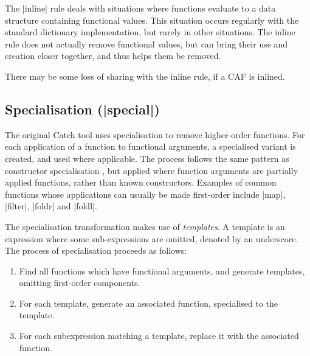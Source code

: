 \documentclass[preprint]{sigplanconf}
\begin{document}
The |inline| rule deals with situations where functions evaluate to a data structure containing functional values. This situation occurs regularly with the standard dictionary implementation, but rarely in other situations. The inline rule does not actually remove functional values, but can bring their use and creation closer together, and thus helps them be removed.

There may be some loss of sharing with the inline rule, if a CAF is inlined.

\subsection{Specialisation (|special|)}

The original Catch tool \cite{me:catch_tfp} uses specialisation to remove higher-order functions. For each application of a function to functional arguments, a specialised variant is created, and used where applicable. The process follows the same pattern as constructor specialisation \cite{spj:specconstr}, but applied where function arguments are partially applied functions, rather than known constructors. Examples of common functions whose applications can usually be made first-order include |map|, |filter|, |foldr| and |foldl|.

The specialisation transformation makes use of \textit{templates}. A template is an expression where some sub-expressions are omitted, denoted by an underscore. The process of specialisation proceeds as follows:

\begin{enumerate}
\item Find all functions which have functional arguments, and generate templates, omitting first-order components.
\item For each template, generate an associated function, specialised to the template.
\item For each subexpression matching a template, replace it with the associated function.
\end{enumerate}
\end{document}
